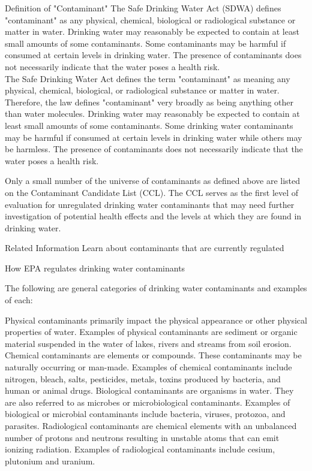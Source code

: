 \documentclass{article}
\begin{document}
Definition of "Contaminant"
The Safe Drinking Water Act (SDWA) defines "contaminant" as any physical, chemical, biological or radiological substance or matter in water. Drinking water may reasonably be expected to contain at least small amounts of some contaminants. Some contaminants may be harmful if consumed at certain levels in drinking water. The presence of contaminants does not necessarily indicate that the water poses a health risk.\\

The Safe Drinking Water Act defines the term "contaminant" as meaning any physical, chemical, biological, or radiological substance or matter in water. Therefore, the law defines "contaminant" very broadly as being anything other than water molecules. Drinking water may reasonably be expected to contain at least small amounts of some contaminants. Some drinking water contaminants may be harmful if consumed at certain levels in drinking water while others may be harmless. The presence of contaminants does not necessarily indicate that the water poses a health risk.

Only a small number of the universe of contaminants as defined above are listed on the Contaminant Candidate List (CCL). The CCL serves as the first level of evaluation for unregulated drinking water contaminants that may need further investigation of potential health effects and the levels at which they are found in drinking water.

Related Information
Learn about contaminants that are currently regulated

How EPA regulates drinking water contaminants

The following are general categories of drinking water contaminants and examples of each:

Physical contaminants primarily impact the physical appearance or other physical properties of water. Examples of physical contaminants are sediment or organic material suspended in the water of lakes, rivers and streams from soil erosion.
Chemical contaminants are elements or compounds. These contaminants may be naturally occurring or man-made. Examples of chemical contaminants include nitrogen, bleach, salts, pesticides, metals, toxins produced by bacteria, and human or animal drugs.
Biological contaminants are organisms in water. They are also referred to as microbes or microbiological contaminants. Examples of biological or microbial contaminants include bacteria, viruses, protozoa, and parasites.
Radiological contaminants are chemical elements with an unbalanced number of protons and neutrons resulting in unstable atoms that can emit ionizing radiation. Examples of radiological contaminants include cesium, plutonium and uranium.\\
\end{document}
